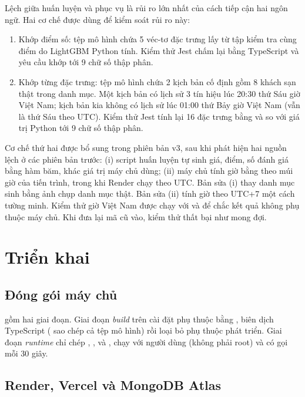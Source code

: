 Lệch giữa huấn luyện và phục vụ là rủi ro lớn nhất của cách tiếp cận hai ngôn ngữ. Hai cơ chế được dùng để kiểm soát rủi ro này:
\begin{enumerate}
\item Khớp điểm số: tệp mô hình chứa 5 véc-tơ đặc trưng lấy từ tập kiểm tra cùng điểm do LightGBM Python tính. Kiểm thử Jest chấm lại bằng TypeScript và yêu cầu khớp tới 9 chữ số thập phân.
\item Khớp từng đặc trưng: tệp mô hình chứa 2 kịch bản cố định gồm 8 khách sạn thật trong danh mục. Một kịch bản có lịch sử 3 tín hiệu lúc 20:30 thứ Sáu giờ Việt Nam; kịch bản kia không có lịch sử lúc 01:00 thứ Bảy giờ Việt Nam (vẫn là thứ Sáu theo UTC). Kiểm thử Jest tính lại 16 đặc trưng bằng  và so với giá trị Python tới 9 chữ số thập phân.
\end{enumerate}
Cơ chế thứ hai được bổ sung trong phiên bản v3, sau khi phát hiện hai nguồn lệch ở các phiên bản trước: (i) script huấn luyện tự sinh giá, điểm, số đánh giá bằng hàm băm, khác giá trị máy chủ dùng; (ii) máy chủ tính giờ bằng  theo múi giờ của tiến trình, trong khi Render chạy theo UTC. Bản sửa (i) thay danh mục sinh bằng ảnh chụp danh mục thật. Bản sửa (ii) tính giờ theo UTC+7 một cách tường minh. Kiểm thử giờ Việt Nam được chạy với  và  để chắc kết quả không phụ thuộc máy chủ. Khi đưa lại mã cũ vào, kiểm thử thất bại như mong đợi.

\section{Triển khai}\label{sec:deploy}

\subsection{Đóng gói máy chủ}

 gồm hai giai đoạn. Giai đoạn \emph{build} trên  cài đặt phụ thuộc bằng , biên dịch TypeScript ( sao chép cả tệp mô hình) rồi loại bỏ phụ thuộc phát triển. Giai đoạn \emph{runtime} chỉ chép , ,  và , chạy với người dùng  (không phải root) và có  gọi  mỗi 30 giây.

\subsection{Render, Vercel và MongoDB Atlas}

